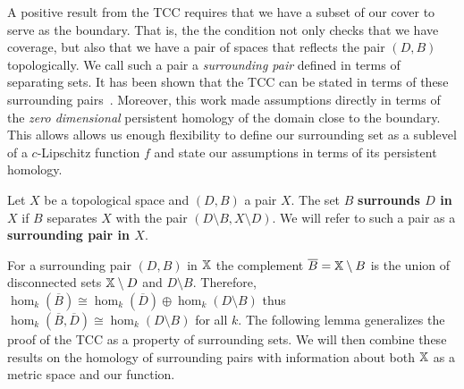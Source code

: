 

A positive result from the TCC requires that we have a subset of our cover to serve as the boundary.
That is, the the condition not only checks that we have coverage, but also that we have a pair of spaces that reflects the pair $(D, B)$ topologically.
We call such a pair a \emph{surrounding pair} defined in terms of separating sets.
It has been shown that the TCC can be stated in terms of these surrounding pairs~\cite{cavanna2017when}.
Moreover, this work made assumptions directly in terms of the \emph{zero dimensional} persistent homology of the domain close to the boundary.
This allows allows us enough flexibility to define our surrounding set as a sublevel of a $c$-Lipschitz function $f$ and state our assumptions in terms of its persistent homology.

\begin{definition}
  Let $X$ be a topological space and $(D,B)$ a pair $X$.
  The set $B$ \textbf{surrounds $D$ in $X$} if $B$ separates $X$ with the pair $(D\setminus B, X\setminus D)$.
  We will refer to such a pair as a \textbf{surrounding pair in $X$}.
\end{definition}

For a surrounding pair $(D,B)$ in $\mathbb{X}$  the complement $\overline{B} = \mathbb{X}\setminus B$ is the union of disconnected sets $\mathbb{X}\setminus D$ and $D\setminus B$.
Therefore, $\hom_k(\overline{B}) \cong \hom_k(\overline{D})\oplus \hom_k(D\setminus B)$ thus $\hom_k(\overline{B},\overline{D})\cong \hom_k(D\setminus B)$ for all $k$.
The following lemma generalizes the proof of the TCC as a property of surrounding sets.%
We will then combine these results on the homology of surrounding pairs with information about both $\mathbb{X}$ as a metric space and our function.

